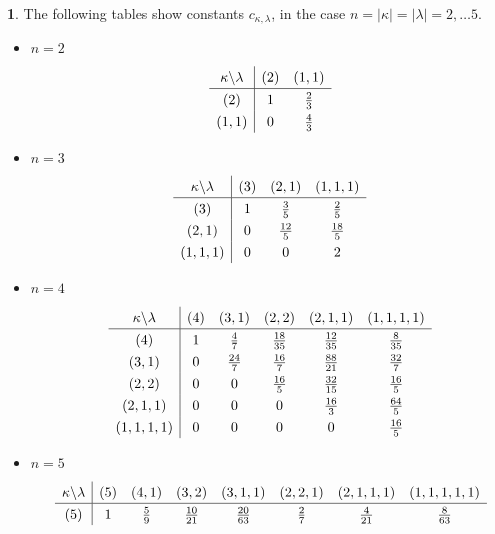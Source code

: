 \documentclass[10pt,oneside,american]{amsart}
\numberwithin{equation}{section}
\numberwithin{figure}{section}
\theoremstyle{definition}
\theoremstyle{remark}
\theoremstyle{plain}
\theoremstyle{definition}
\newtheorem{example}{\protect\examplename}[section]
\theoremstyle{plain}
\theoremstyle{plain}
\theoremstyle{plain}
\providecommand{\examplename}{Example}
\begin{document}
\begin{example}
\label{Tables}The following tables \cite[pp.~238]{Muirhead} show
constants $c_{\kappa,\lambda}$, in the case $n=\left|\kappa\right|=\left|\lambda\right|=2,\ldots5$. 
\begin{itemize}
\item $n=2$
\[
\def\arraystretch{1.3}
\begin{array}{c|cc}
\kappa\backslash\lambda & \left(2\right) & \left(1,1\right)\\ \hline
\left(2\right) & 1 & \frac{2}{3}\\
\left(1,1\right) & 0 & \frac{4}{3}
\end{array}
\]
\item $n=3$
\[
\def\arraystretch{1.3}
\begin{array}{c|ccc}
\kappa\backslash\lambda & \left(3\right) & \left(2,1\right) & \left(1,1,1\right)\\ \hline
\left(3\right) & 1 & \frac{3}{5} & \frac{2}{5}\\
\left(2,1\right) & 0 & \frac{12}{5} & \frac{18}{5}\\
\left(1,1,1\right) & 0 & 0 & 2
\end{array}
\]
\item $n=4$
\[
\def\arraystretch{1.3}
\begin{array}{c|ccccc}
\kappa\backslash\lambda & \left(4\right) & \left(3,1\right) & \left(2,2\right) & \left(2,1,1\right) & \left(1,1,1,1\right)\\ \hline
\left(4\right) & 1 & \frac{4}{7} & \frac{18}{35} & \frac{12}{35} & \frac{8}{35}\\
\left(3,1\right) & 0 & \frac{24}{7} & \frac{16}{7} & \frac{88}{21} & \frac{32}{7}\\
\left(2,2\right) & 0 & 0 & \frac{16}{5} & \frac{32}{15} & \frac{16}{5}\\
\left(2,1,1\right) & 0 & 0 & 0 & \frac{16}{3} & \frac{64}{5}\\
\left(1,1,1,1\right) & 0 & 0 & 0 & 0 & \frac{16}{5}
\end{array}
\]
\item $n=5$
\[
\def\arraystretch{1.3}
\begin{array}{c|ccccccc}
\kappa\backslash\lambda & \left(5\right) & \left(4,1\right) & \left(3,2\right) & \left(3,1,1\right) & \left(2,2,1\right) & \left(2,1,1,1\right) & \left(1,1,1,1,1\right)\\ \hline
\left(5\right) & 1 & \frac{5}{9} & \frac{10}{21} & \frac{20}{63} & \frac{2}{7} & \frac{4}{21} & \frac{8}{63}\\

\end{array}\]
\end{itemize}
\end{example}
\end{document}
